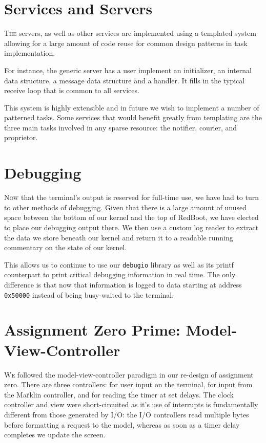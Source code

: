 \documentclass{article}
\begin{document}
\section*{Services and Servers}

\textsc{The} servers, as well as other services are implemented using a templated system
allowing for a large amount of code reuse for common design patterns in task
implementation.

For instance, the generic server has a user implement an initializer, an
internal data structure, a message data structure and a handler. It fills in the
typical receive loop that is common to all services.

This system is highly extensible and in future we wish to implement a number of
patterned tasks. Some services that would benefit greatly from templating are
the three main tasks involved in any sparse resource: the notifier, courier, and
proprietor.

\section*{Debugging}

\textsc{Now} that the terminal's output is reserved for full-time use, we have
had to turn to other methods of debugging. Given that there is a large amount of
unused space between the bottom of our kernel and the top of RedBoot, we have
elected to place our debugging output there.  We then use a custom log reader to
extract the data we store beneath our kernel and return it to a readable running
commentary on the state of our kernel.

This allows us to continue to use our \texttt{debugio} library as well as its
printf counterpart to print critical debugging information in real time. The
only difference is that now that information is logged to data starting at
address \texttt{0x50000} instead of being busy-waited to the terminal.

\section*{Assignment Zero Prime: Model-View-Controller}

\textsc{We} followed the model-view-controller paradigm in our re-design of assignment zero. There are three controllers: for user input on the terminal, for input from the Ma\"rklin controller, and for reading the timer at set delays. The clock controller and view were short-circuited as it's use of interrupts is fundamentally different from those generated by I/O: the I/O controllers read multiple bytes before formatting a request to the model, whereas as soon as a timer delay completes we update the screen.
\end{document}
